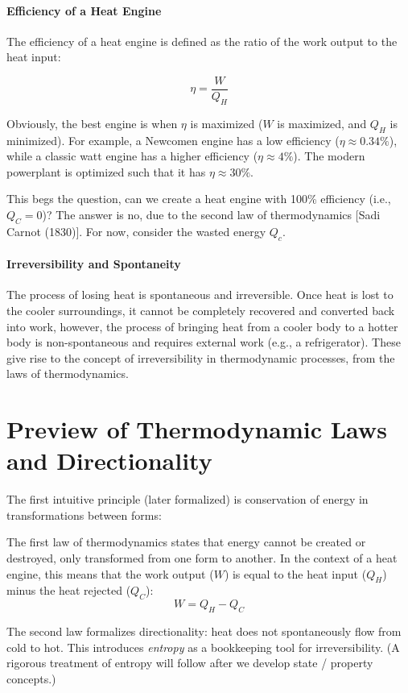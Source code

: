 \documentclass[11pt]{report}
\begin{document}
\paragraph{Efficiency of a Heat Engine} The efficiency of a heat engine is defined as the ratio of the work output to the heat input:

\begin{equation}
    \eta = \frac{W}{Q_H}
\end{equation}

Obviously, the best engine is when $\eta$ is maximized ($W$ is maximized, and $Q_H$ is minimized). For example, a Newcomen engine has a low efficiency ($\eta \approx 0.34\%$), while a classic watt engine has a higher efficiency ($\eta \approx 4\%$). The modern powerplant is optimized such that it has $\eta \approx 30\%$.

This begs the question, can we create a heat engine with 100\% efficiency (i.e., $Q_C = 0$)? The answer is no, due to the second law of thermodynamics [Sadi Carnot (1830)]. For now, consider the wasted energy $Q_c$. 

\paragraph{Irreversibility and Spontaneity} The process of losing heat is spontaneous and irreversible. Once heat is lost to the cooler surroundings, it cannot be completely recovered and converted back into work, however, the process of bringing heat from a cooler body to a hotter body is non-spontaneous and requires external work (e.g., a refrigerator). These give rise to the concept of irreversibility in thermodynamic processes, from the laws of thermodynamics.

\section{Preview of Thermodynamic Laws and Directionality}
The first intuitive principle (later formalized) is conservation of energy in transformations between forms:
\begin{definition} \label{def:firstlaw}
    The first law of thermodynamics states that energy cannot be created or destroyed, only transformed from one form to another. In the context of a heat engine, this means that the work output ($W$) is equal to the heat input ($Q_H$) minus the heat rejected ($Q_C$):
    \begin{equation}
        W = Q_H - Q_C
    \end{equation}
\end{definition}
The second law formalizes directionality: heat does not spontaneously flow from cold to hot. This introduces \emph{entropy} as a bookkeeping tool for irreversibility. (A rigorous treatment of entropy will follow after we develop state / property concepts.)
\end{document}
